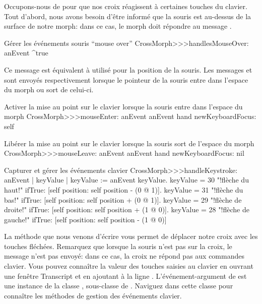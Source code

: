 \documentclass[a4paper,10pt,twoside]{book}
\begin{document}
Occupons-nous de  pour que nos croix réagissent à
certaines touches du clavier. Tout d'abord, nous avons besoin d'être
informé que la souris est au-dessus de la surface de notre morph:
dans ce cas, le morph doit répondre  au message
.


\begin{method}{Gérer les événements souris ``mouse over''} 
CrossMorph>>>handlesMouseOver: anEvent
	^true
\end{method}

\noindent
Ce message est équivalent à 
utilisé pour la position de la souris.
Les messages  et
 sont envoyés respectivement lorsque le
pointeur de la souris entre dans l'espace du morph ou sort de celui-ci.

\begin{method}{Activer la mise au point sur le clavier lorsque la souris entre dans l'espace du morph}
CrossMorph>>>mouseEnter: anEvent
	anEvent hand newKeyboardFocus: self
\end{method}

\begin{method}{Libérer la mise au point sur le clavier lorsque la souris sort de l'espace du morph}
CrossMorph>>>mouseLeave: anEvent
	anEvent hand newKeyboardFocus: nil
\end{method}

\begin{method}[handleKeystroke]{Capturer et gérer les événements clavier}
CrossMorph>>>handleKeystroke: anEvent
	| keyValue |
	keyValue := anEvent keyValue.
	keyValue = 30	 "!flèche du haut!"
		ifTrue: [self position: self position - (0 @ 1)].
	keyValue = 31	 "!flèche du bas!"
		ifTrue: [self position: self position + (0 @ 1)].
	keyValue = 29	 "!flèche de droite!"
		ifTrue: [self position: self position + (1 @ 0)].
	keyValue = 28	 "!flèche de gauche!"
		ifTrue: [self position: self position - (1 @ 0)]
\end{method}

La méthode que nous venons d'écrire vous permet de déplacer
notre croix avec les touches fléchées. Remarquez que lorsque la
souris n'est pas sur la croix, le message
 n'est pas envoyé: dans ce cas, la croix
ne répond pas aux commandes clavier.
Vous pouvez connaître la valeur des touches saisies au clavier en
ouvrant une fenêtre Transcript et en ajoutant à 
 la ligne 
 .
L'événement-argument  de  est une
instance de la classe , sous-classe de
. Naviguez dans cette classe pour connaître les
méthodes de gestion des événements clavier.
\end{document}
